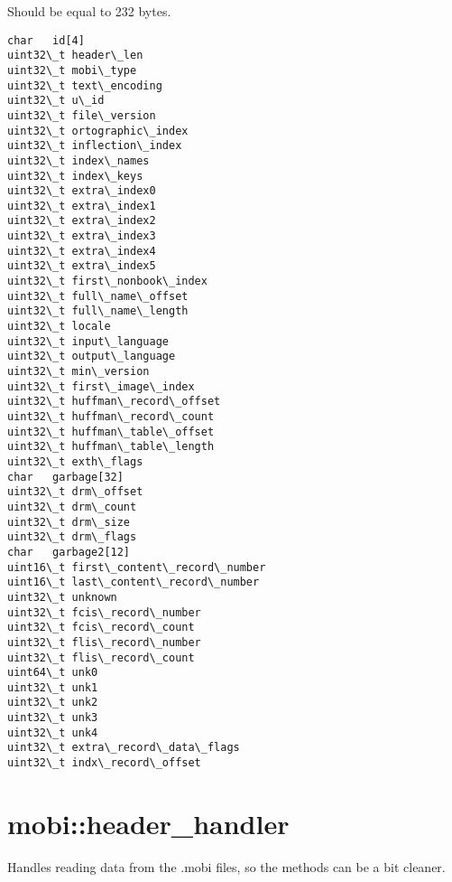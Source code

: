 \documentclass[letterpaper,10pt,english]{sphinxmanual}
\begin{document}

\begin{fulllineitems}
\label{headers:st_mobi}
Should be equal to 232 bytes.

\begin{Verbatim}[commandchars=\\\{\}]
char   id[4]
uint32\_t header\_len
uint32\_t mobi\_type
uint32\_t text\_encoding
uint32\_t u\_id
uint32\_t file\_version
uint32\_t ortographic\_index
uint32\_t inflection\_index
uint32\_t index\_names
uint32\_t index\_keys
uint32\_t extra\_index0
uint32\_t extra\_index1
uint32\_t extra\_index2
uint32\_t extra\_index3
uint32\_t extra\_index4
uint32\_t extra\_index5
uint32\_t first\_nonbook\_index
uint32\_t full\_name\_offset
uint32\_t full\_name\_length
uint32\_t locale
uint32\_t input\_language
uint32\_t output\_language
uint32\_t min\_version
uint32\_t first\_image\_index
uint32\_t huffman\_record\_offset
uint32\_t huffman\_record\_count
uint32\_t huffman\_table\_offset
uint32\_t huffman\_table\_length
uint32\_t exth\_flags
char   garbage[32]
uint32\_t drm\_offset
uint32\_t drm\_count
uint32\_t drm\_size
uint32\_t drm\_flags
char   garbage2[12]
uint16\_t first\_content\_record\_number
uint16\_t last\_content\_record\_number
uint32\_t unknown
uint32\_t fcis\_record\_number
uint32\_t fcis\_record\_count
uint32\_t flis\_record\_number
uint32\_t flis\_record\_count
uint64\_t unk0
uint32\_t unk1
uint32\_t unk2
uint32\_t unk3
uint32\_t unk4
uint32\_t extra\_record\_data\_flags
uint32\_t indx\_record\_offset
\end{Verbatim}

\end{fulllineitems}



\section{mobi::header\_handler}
\label{header_handler::doc}\label{header_handler:mobi-header-handler}

\begin{fulllineitems}
\label{header_handler:header_handler}
Handles reading data from the .mobi files, so the {\hyperref[mobireader:mobi::mobireader]{}}
methods can be a bit cleaner.

\end{fulllineitems}
\end{document}
